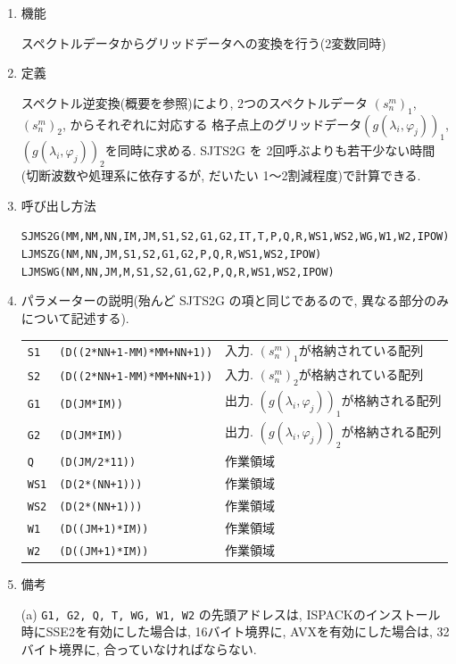 \documentclass[a4j]{jarticle}
\begin{document}
\begin{enumerate}

\item 機能 

スペクトルデータからグリッドデータへの変換を行う(2変数同時)

\item 定義

スペクトル逆変換(概要を参照)により, 2つのスペクトルデータ
$(s^m_n)_1$, $(s^m_n)_2$, からそれぞれに対応する
格子点上のグリッドデータ$(g(\lambda_i,\varphi_j))_1$,
$(g(\lambda_i,\varphi_j))_2$を同時に求める. SJTS2G を
2回呼ぶよりも若干少ない時間(切断波数や処理系に依存するが,
だいたい 1〜2割減程度)で計算できる.

\item 呼び出し方法

{\tt SJMS2G(MM,NM,NN,IM,JM,S1,S2,G1,G2,IT,T,P,Q,R,WS1,WS2,WG,W1,W2,IPOW)}\\
{\tt LJMSZG(NM,NN,JM,S1,S2,G1,G2,P,Q,R,WS1,WS2,IPOW)}\\
{\tt LJMSWG(NM,NN,JM,M,S1,S2,G1,G2,P,Q,R,WS1,WS2,IPOW)}
  
\item パラメーターの説明(殆んど SJTS2G の項と同じであるので,
異なる部分のみについて記述する).

\begin{tabular}{lll}
{\tt S1} & {\tt (D((2*NN+1-MM)*MM+NN+1))} & 入力. $(s^m_n)_1$が格納されている配列\\
{\tt S2} & {\tt (D((2*NN+1-MM)*MM+NN+1))} & 入力. $(s^m_n)_2$が格納されている配列\\
{\tt G1} & {\tt (D(JM*IM))} & 出力. $(g(\lambda_i,\varphi_j))_1$が格納される配列\\
{\tt G2} & {\tt (D(JM*IM))} & 出力. $(g(\lambda_i,\varphi_j))_2$が格納される配列\\
{\tt Q} & {\tt (D(JM/2*11))} & 作業領域\\
{\tt WS1} & {\tt (D(2*(NN+1)))} & 作業領域\\
{\tt WS2} & {\tt (D(2*(NN+1)))} & 作業領域\\
{\tt W1} & {\tt (D((JM+1)*IM))} & 作業領域\\
{\tt W2} & {\tt (D((JM+1)*IM))} & 作業領域
\end{tabular}

\item 備考

(a) {\tt G1, G2, Q, T, WG, W1, W2}
の先頭アドレスは,
ISPACKのインストール時にSSE2を有効にした場合は,
16バイト境界に,
AVXを有効にした場合は,
32バイト境界に,
合っていなければならない.

\end{enumerate}
\end{document}
